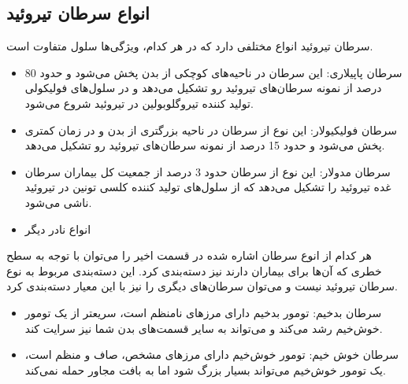 \subsection{انواع سرطان تیروئید}\label{subsec:انواع-سرطان-تیروئید}

سرطان تیروئید انواع مختلفی دارد که در هر کدام، ویژگی‌ها سلول متفاوت است.

\begin{itemize}
    \item سرطان پاپیلاری:
    این سرطان در ناحیه‌های کوچکی از بدن پخش می‌شود و حدود 80 درصد از نمونه سرطان‌های تیروئید رو تشکیل می‌دهد و در سلول‌های فولیکولی تولید کننده تیروگلوبولین در تیروئید شروع می‌شود.
    \item سرطان فولیکیولار:
    این نوع از سرطان در ناحیه بزرگتری از بدن و در زمان کمتری پخش می‌شود و حدود 15 درصد از نمونه سرطان‌های تیروئید رو تشکیل می‌دهد.
    \item سرطان مدولار:
    این نوع از سرطان حدود 3 درصد از جمعیت کل بیماران سرطان غده تیروئید را تشکیل می‌دهد که از سلول‌های تولید کننده کلسی تونین در تیروئید ناشی می‌شود.
    \item انواع نادر دیگر
\end{itemize}

هر کدام از انوع سرطان اشاره شده در قسمت اخیر را می‌توان با توجه به سطح خطری که آن‌ها برای بیماران دارند نیز دسته‌بندی کرد.
این دسته‌بندی مربوط به نوع سرطان تیروئید نیست و می‌توان سرطان‌های دیگری را نیز با این معیار دسته‌بندی کرد.
\begin{itemize}
    \item سرطان بدخیم:
    تومور بدخیم دارای مرزهای نامنظم است، سریعتر از یک تومور خوش‌خیم رشد می‌کند و می‌تواند به سایر قسمت‌های بدن شما نیز سرایت کند.
    \item سرطان خوش خیم:
    تومور خوش‌خیم دارای مرزهای مشخص، صاف و منظم است، یک تومور خوش‌خیم می‌تواند بسیار بزرگ شود اما به بافت مجاور حمله نمی‌کند.
\end{itemize}